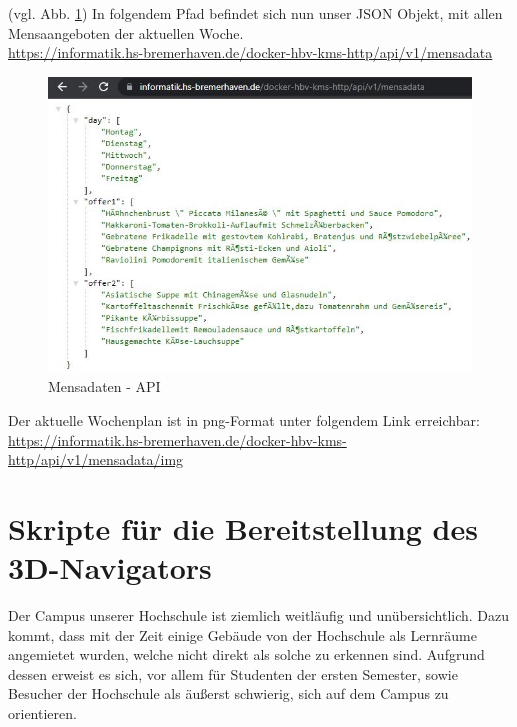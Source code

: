 (vgl. Abb. \ref{fig:mensaapi}) In folgendem Pfad befindet sich nun unser JSON Objekt, mit allen Mensaangeboten der aktuellen Woche.\\
\url{https://informatik.hs-bremerhaven.de/docker-hbv-kms-http/api/v1/mensadata}
\\
\begin{figure}[H]
    \centering
    \includegraphics[width=13cm]{Figures/AppChapter/mensa_5.JPG}
    \caption{Mensadaten - API}
    \label{fig:mensaapi}
    \centering
\end{figure}

Der aktuelle Wochenplan ist in png-Format unter folgendem Link erreichbar:\\
\url{https://informatik.hs-bremerhaven.de/docker-hbv-kms-http/api/v1/mensadata/img}\\


\newpage
\section{Skripte für die Bereitstellung des 3D-Navigators}

Der Campus unserer Hochschule ist ziemlich weitläufig und unübersichtlich. Dazu kommt, dass mit der Zeit einige Gebäude von der Hochschule als Lernräume angemietet wurden, welche nicht direkt als solche zu erkennen sind. Aufgrund dessen erweist es sich, vor allem für Studenten der ersten Semester, sowie Besucher der Hochschule als äußerst schwierig, sich auf dem Campus zu orientieren.\\

